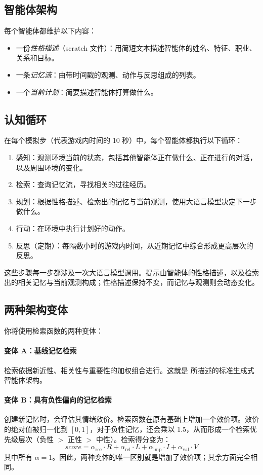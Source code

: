\subsection{智能体架构}

每个智能体都维护以下内容：
\begin{itemize}
    \item 一份\textit{性格描述}（scratch 文件）：用简短文本描述智能体的姓名、特征、职业、关系和目标。
    \item 一条\textit{记忆流}：由带时间戳的观测、动作与反思组成的列表。
    \item 一个\textit{当前计划}：简要描述智能体打算做什么。
\end{itemize}

\subsection{认知循环}

在每个模拟步（代表游戏内时间的 10 秒）中，每个智能体都执行以下循环：
\begin{enumerate}
    \item 感知：观测环境当前的状态，包括其他智能体正在做什么、正在进行的对话，以及周围环境的变化。
    \item 检索：查询记忆流，寻找相关的过往经历。
    \item 规划：根据性格描述、检索出的记忆与当前观测，使用大语言模型决定下一步做什么。
    \item 行动：在环境中执行计划好的动作。
    \item 反思（定期）：每隔数小时的游戏内时间，从近期记忆中综合形成更高层次的反思。
\end{enumerate}

这些步骤每一步都涉及一次大语言模型调用。提示由智能体的性格描述，以及检索出的相关记忆与当前观测构成；性格描述保持不变，而记忆与观测则会动态变化。

\subsection{两种架构变体}

你将使用检索函数的两种变体：

\paragraph{变体 A：基线记忆检索}
检索依据新近性、相关性与重要性的加权组合进行。这就是 \citet{park2023generative} 所描述的标准生成式智能体架构。

\paragraph{变体 B：具有负性偏向的记忆检索}
创建新记忆时，会评估其情绪效价。检索函数在原有基础上增加一个效价项。效价的绝对值被归一化到 $[0, 1]$，对于负性记忆，还会乘以 1.5，从而形成一个检索优先级层次（负性 $>$ 正性 $>$ 中性）。检索得分变为：
\begin{equation}\label{eq:retrieval-never}
    \textit{score} = \alpha_{\text{rec}} \cdot R + \alpha_{\text{rel}} \cdot L + \alpha_{\text{imp}} \cdot I + \alpha_{\text{val}} \cdot V
\end{equation}
其中所有 $\alpha = 1$。因此，两种变体的唯一区别就是增加了效价项；其余方面完全相同。

